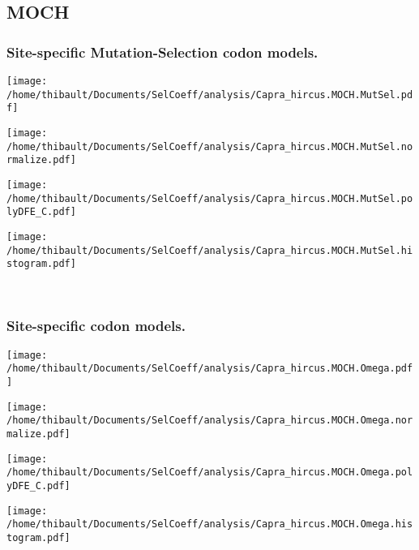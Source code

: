 \subsection{MOCH} 
 
\subsubsection*{Site-specific Mutation-Selection codon models.} 
\begin{minipage}{0.49\linewidth} 
\texttt{[image: /home/thibault/Documents/SelCoeff/analysis/Capra\_hircus.MOCH.MutSel.pdf]} 
\end{minipage}
\begin{minipage}{0.49\linewidth} 
\texttt{[image: /home/thibault/Documents/SelCoeff/analysis/Capra\_hircus.MOCH.MutSel.normalize.pdf]} 
\end{minipage}
\begin{minipage}{0.49\linewidth} 
\texttt{[image: /home/thibault/Documents/SelCoeff/analysis/Capra\_hircus.MOCH.MutSel.polyDFE\_C.pdf]} 
\end{minipage}
\begin{minipage}{0.49\linewidth} 
\texttt{[image: /home/thibault/Documents/SelCoeff/analysis/Capra\_hircus.MOCH.MutSel.histogram.pdf]} 
\end{minipage}
\\ 
\subsubsection*{Site-specific codon models.} 
\begin{minipage}{0.49\linewidth} 
\texttt{[image: /home/thibault/Documents/SelCoeff/analysis/Capra\_hircus.MOCH.Omega.pdf]} 
\end{minipage}
\begin{minipage}{0.49\linewidth} 
\texttt{[image: /home/thibault/Documents/SelCoeff/analysis/Capra\_hircus.MOCH.Omega.normalize.pdf]} 
\end{minipage}
\begin{minipage}{0.49\linewidth} 
\texttt{[image: /home/thibault/Documents/SelCoeff/analysis/Capra\_hircus.MOCH.Omega.polyDFE\_C.pdf]} 
\end{minipage}
\begin{minipage}{0.49\linewidth} 
\texttt{[image: /home/thibault/Documents/SelCoeff/analysis/Capra\_hircus.MOCH.Omega.histogram.pdf]} 
\end{minipage}
\\ 
